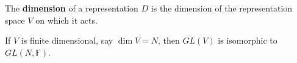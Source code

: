 \begin{definition}
    The \textbf{dimension} of a representation $D$ is the dimension of the representation space $V$ on which it acts.
\end{definition}

If $V$ is finite dimensional, say $\dim V = N$, then $GL \left( V \right) $ is isomorphic to $GL \left( N, \mathbb{F} \right) $.




